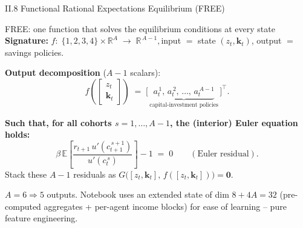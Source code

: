 \documentclass[aspectratio=169,11pt]{beamer}
\newcommand{\R}{\mathbb{R}}
\newcommand{\E}[1]{\mathbb{E}\!\left[#1\right]}
\begin{document}
\begin{frame}{II.8 Functional Rational Expectations Equilibrium (FREE)}
\footnotesize
\begin{exampleblock}{FREE: one function that solves the equilibrium conditions at every state}
\vspace{-2pt}
\textbf{Signature:}\;
$
f:\;\{1,2,3,4\}\times \R^{A} \;\longrightarrow\; \R^{\,A-1},
$\quad input $=$ state $(z_t, \bm{k}_t)$, output $=$ savings policies.

\vspace{2pt}
\textbf{Output decomposition} ($A-1$ scalars):
\[
f\!\left(\!\begin{bmatrix} z_t \\ \bm{k}_t \end{bmatrix}\!\right)
\;=\;
\bigl[\,\underbrace{a_t^{\,1},\,a_t^{\,2},\,\ldots,\,a_t^{\,A-1}}_{\text{capital-investment policies}}\,\bigr]^{\!\top}.
\]
\end{exampleblock}

\textbf{Such that, for all cohorts $s = 1, \ldots, A-1$, the (interior) Euler equation holds:}
\[
\beta\,\E{\frac{r_{t+1}\,u'(c_{t+1}^{\,s+1})}{u'(c_t^{\,s})}} - 1 \;=\; 0 \qquad (\text{Euler residual}).
\]
Stack these $A-1$ residuals as $G\bigl([z_t, \bm{k}_t],\, f([z_t, \bm{k}_t])\bigr) = \bm{0}$.

{\scriptsize $A=6 \Rightarrow 5$ outputs.  Notebook uses an extended state of dim $8+4A=32$ (pre-computed aggregates + per-agent income blocks) for ease of learning -- pure feature engineering.}
\end{frame}
\end{document}
